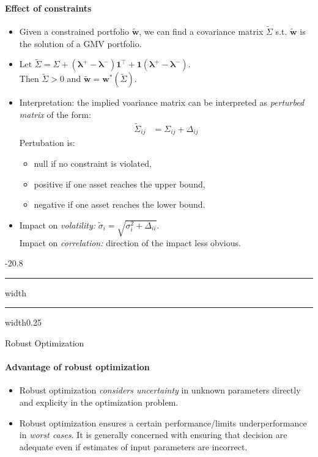 \documentclass[a4paper,landscape,8pt,fleqn]{scrartcl}
\makeatletter
\renewcommand{\subsection}{\@startsection{subsection}{1}{0mm}%
{-2\baselineskip}{0.8\baselineskip}%
{\hrule depth 0.2pt width\columnwidth\hrule depth0.75pt
width0.25\columnwidth\vspace*{1.2em}\large\bfseries}}
\makeatother
\begin{document}
\begin{multicols*}{3}
\paragraph{Effect of constraints}
\begin{itemize}
\item Given a constrained portfolio $\tilde{\bm w}$, we can find a covariance matrix $\tilde \Sigma$ s.t. $\tilde{\bm w}$ is the solution of a GMV portfolio.
\item Let $\tilde \Sigma = \Sigma + (\bm \lambda^+ - \bm \lambda^-) \bm 1^\top + \bm 1 (\bm \lambda^+ - \bm \lambda^-)$. \\
Then $\tilde \Sigma > 0$ and $\bm{\tilde w} = \bm w^\ast(\tilde \Sigma)$.
\item Interpretation: the implied voariance matrix can be interpreted as \textit{perturbed matrix} of the form:
\begin{align*}
\tilde \Sigma_{ij} &= \Sigma_{ij} + \Delta_{ij}
\end{align*}
Pertubation is:
\begin{itemize}
\item null if no constraint is violated,
\item positive if one asset reaches the upper bound,
\item negative if one asset reaches the lower bound.
\end{itemize}
\item Impact on \textit{volatility:} $\tilde \sigma_i = \sqrt{\sigma_i^2 + \Delta_{ii}}$. \\
Impact on \textit{correlation:} direction of the impact less obvious.
\end{itemize}

\subsection{Robust Optimization}

\paragraph{Advantage of robust optimization}
\begin{itemize}
\item Robust optimization \textit{considers uncertainty} in unknown parameters directly and explicity in the optimization problem.
\item Robust optimization ensures a certain performance/limits underperformance in \textit{worst cases}.
It is generally concerned with ensuring that decision are adequate even if estimates of input parameters are incorrect.
\end{itemize}


\end{multicols*}
\end{document}
